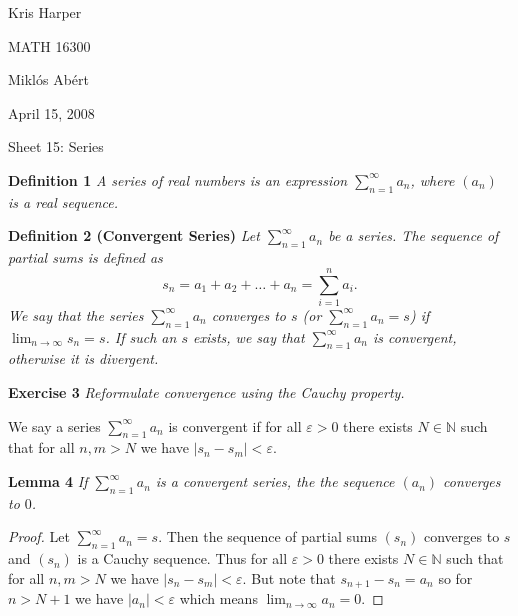 \documentclass{article}
\begin{document}
\begin{flushright}
Kris Harper

MATH 16300

Mikl\'{o}s Ab\'{e}rt

April 15, 2008
\end{flushright}

\begin{flushleft}

\Large

Sheet 15: Series\newline

\normalsize

\textbf{Definition 1}
\textsl{A series of real numbers is an expression $\sum_{n=1}^{\infty} a_n$, where $(a_n)$ is a real sequence.}\newline

\textbf{Definition 2 (Convergent Series)}
\textsl{Let $\sum_{n=1}^{\infty} a_n$ be a series. The sequence of partial sums is defined as
\[
s_n = a_1 + a_2 + \dots + a_n = \sum_{i=1}^{n} a_i.
\]
We say that the series $\sum_{n=1}^{\infty} a_n$ converges to $s$ (or $\sum_{n=1}^{\infty} a_n = s$) if $\lim_{n \rightarrow \infty} s_n = s$. If such an $s$ exists, we say that $\sum_{n=1}^{\infty} a_n$ is convergent, otherwise it is divergent.}\newline

\textbf{Exercise 3}
\textsl{Reformulate convergence using the Cauchy property.}\newline

We say a series $\sum_{n=1}^{\infty} a_n$ is convergent if for all $\varepsilon > 0$ there exists $N \in \mathbb{N}$ such that for all $n, m > N$ we have $|s_n - s_m| < \varepsilon$.\newline

\textbf{Lemma 4}
\textsl{If $\sum_{n=1}^{\infty} a_n$ is a convergent series, the the sequence $(a_n)$ converges to $0$.}
\begin{proof}
Let $\sum_{n=1}^{\infty} a_n = s$. Then the sequence of partial sums $(s_n)$ converges to $s$ and $(s_n)$ is a Cauchy sequence. Thus for all $\varepsilon > 0$ there exists $N \in \mathbb{N}$ such that for all $n,m > N$ we have $|s_n - s_m| < \varepsilon$. But note that $s_{n+1} - s_n= a_n$ so for $n > N+1$ we have $|a_n| < \varepsilon$ which means $\lim_{n \rightarrow \infty} a_n = 0$.
\end{proof}


\end{flushleft}
\end{document}
